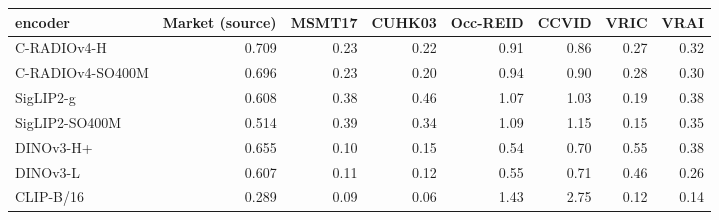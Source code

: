 \begin{tabular}{lrrrrrrr}
\toprule
encoder & Market (source) & MSMT17 & CUHK03 & Occ-REID & CCVID & VRIC & VRAI \\
\midrule
C-RADIOv4-H & 0.709 & 0.23 & 0.22 & 0.91 & 0.86 & 0.27 & 0.32 \\
C-RADIOv4-SO400M & 0.696 & 0.23 & 0.20 & 0.94 & 0.90 & 0.28 & 0.30 \\
SigLIP2-g & 0.608 & 0.38 & 0.46 & 1.07 & 1.03 & 0.19 & 0.38 \\
SigLIP2-SO400M & 0.514 & 0.39 & 0.34 & 1.09 & 1.15 & 0.15 & 0.35 \\
DINOv3-H+ & 0.655 & 0.10 & 0.15 & 0.54 & 0.70 & 0.55 & 0.38 \\
DINOv3-L & 0.607 & 0.11 & 0.12 & 0.55 & 0.71 & 0.46 & 0.26 \\
CLIP-B/16 & 0.289 & 0.09 & 0.06 & 1.43 & 2.75 & 0.12 & 0.14 \\
\bottomrule
\end{tabular}
